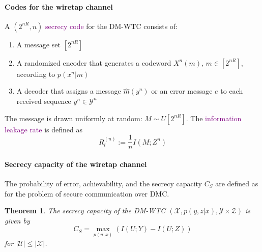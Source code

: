 \documentclass[a4paper, 11pt, openany]{book}
\numberwithin{equation}{section}
\theoremstyle{plain}
\newtheorem{theorem}	[equation]	{Theorem}
\theoremstyle{definition}
\newcommand{\Define}[1]{\textcolor{purple}{#1}}
\newcommand{\alphabet}[1]{\mathcal{#1}}
\begin{document}
\begin{center}
\end{center}



\paragraph{Codes for the wiretap channel}

A $(2^{nR}, n)$ \Define{secrecy code} for the DM-WTC consists of:
\begin{enumerate}
	\item A message set $[2^{nR}]$

	\item A randomized encoder that generates a codeword $X^n(m)$, $m \in [2^{nR}]$,
according to $p(x^n|m)$

	\item A decoder that assigns a message $\hat{m}(y^n)$ or an error message $e$ to each
received sequence $y^n \in \alphabet{Y}^n$
\end{enumerate}

The message is drawn uniformly at random: $M \sim U[2^{nR}]$. The \Define{information leakage rate} is defined as 
\[
	R_l^{(n)} := \frac{1}{n} I(M;Z^n)
\]


\paragraph{Secrecy capacity of the wiretap channel}
The probability of error, achievability, and the secrecy capacity $C_S$ are defined as
for the problem of secure communication over DMC.

\begin{theorem} 
The secrecy capacity of the DM-WTC $(\alphabet{X}, p(y, z|x), \alphabet{Y} \times \alphabet{Z})$ is given by
\[
	C_S = \max_{p(u,x)} ( I(U; Y ) - I(U;Z) )
\]
for $|\alphabet{U}| \le |\alphabet{X}|$.
\end{theorem}
\end{document}

